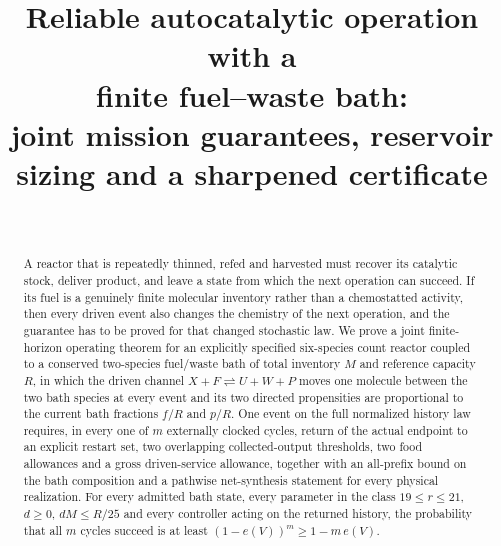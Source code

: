 \documentclass[11pt,a4paper]{article}
\title{Reliable autocatalytic operation with a\\ finite fuel--waste bath:\\[4pt]
\large joint mission guarantees, reservoir sizing and a sharpened certificate}
\author{\PaperAuthor\\ \small \PaperAffiliation}
\date{\PaperDate}
\theoremstyle{plain}
\theoremstyle{definition}
\theoremstyle{remark}
\begin{document}
\maketitle

\begin{abstract}
A reactor that is repeatedly thinned, refed and harvested must recover its catalytic stock, deliver product, and leave a state from which the next operation can succeed. If its fuel is a genuinely finite molecular inventory rather than a chemostatted activity, then every driven event also changes the chemistry of the next operation, and the guarantee has to be proved for that changed stochastic law. We prove a joint finite-horizon operating theorem for an explicitly specified six-species count reactor coupled to a conserved two-species fuel/waste bath of total inventory $M$ and reference capacity $R$, in which the driven channel $X+F\rightleftharpoons U+W+P$ moves one molecule between the two bath species at every event and its two directed propensities are proportional to the current bath fractions $f/R$ and $p/R$. One event on the full normalized history law requires, in every one of $m$ externally clocked cycles, return of the actual endpoint to an explicit restart set, two overlapping collected-output thresholds, two food allowances and a gross driven-service allowance, together with an all-prefix bound on the bath composition and a pathwise net-synthesis statement for every physical realization. For every admitted bath state, every parameter in the class $19\le r\le21$, $d\ge0$, $dM\le R/25$ and every controller acting on the returned history, the probability that all $m$ cycles succeed is at least $(1-e(V))^{m}\ge1-m\,e(V)$.


\end{abstract}
\end{document}
